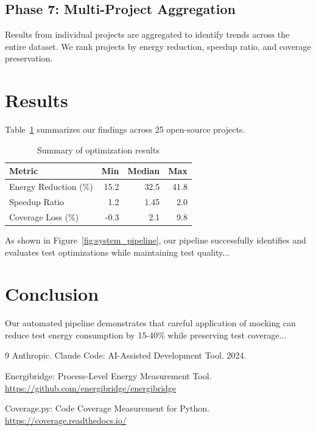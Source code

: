 \documentclass{article} %
\begin{document}
\subsection{Phase 7: Multi-Project Aggregation}
Results from individual projects are aggregated to identify trends across the entire dataset. We rank projects by energy reduction, speedup ratio, and coverage preservation.

\section{Results}

Table~\ref{tab:results} summarizes our findings across 25 open-source projects.

\begin{table}[t]
\centering
\caption{Summary of optimization results}
\label{tab:results}
\begin{tabular}{lrrr}
\hline
\textbf{Metric} & \textbf{Min} & \textbf{Median} & \textbf{Max} \\
\hline
Energy Reduction (\%) & 15.2 & 32.5 & 41.8 \\
Speedup Ratio & 1.2 & 1.45 & 2.0 \\
Coverage Loss (\%) & -0.3 & 2.1 & 9.8 \\
\hline
\end{tabular}
\end{table}

As shown in Figure~\ref{fig:system_pipeline}, our pipeline successfully identifies and evaluates test optimizations while maintaining test quality...

\section{Conclusion}
Our automated pipeline demonstrates that careful application of mocking can reduce test energy consumption by 15-40\% while preserving test coverage...

\begin{thebibliography}{9}
Anthropic. Claude Code: AI-Assisted Development Tool. 2024.

Energibridge: Process-Level Energy Measurement Tool. \url{https://github.com/energibridge/energibridge}

Coverage.py: Code Coverage Measurement for Python. \url{https://coverage.readthedocs.io/}
\end{thebibliography}
\end{document}
